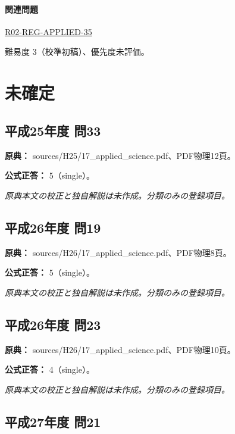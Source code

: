 \paragraph{関連問題} \hyperref[q:r02-reg-applied-35]{R02-REG-APPLIED-35}

\par 難易度 3（校準初稿）、優先度未評価。

\section{未確定}

\subsection{平成25年度 問33}
\label{q:h25-reg-applied-33}

\noindent\textbf{原典：} sources/H25/17\_applied\_science.pdf、PDF物理12頁。

\textbf{公式正答：} 5（single）。

\par\textit{原典本文の校正と独自解説は未作成。分類のみの登録項目。}

\subsection{平成26年度 問19}
\label{q:h26-reg-applied-19}

\noindent\textbf{原典：} sources/H26/17\_applied\_science.pdf、PDF物理8頁。

\textbf{公式正答：} 5（single）。

\par\textit{原典本文の校正と独自解説は未作成。分類のみの登録項目。}

\subsection{平成26年度 問23}
\label{q:h26-reg-applied-23}

\noindent\textbf{原典：} sources/H26/17\_applied\_science.pdf、PDF物理10頁。

\textbf{公式正答：} 4（single）。

\par\textit{原典本文の校正と独自解説は未作成。分類のみの登録項目。}

\subsection{平成27年度 問21}
\label{q:h27-reg-applied-21}

